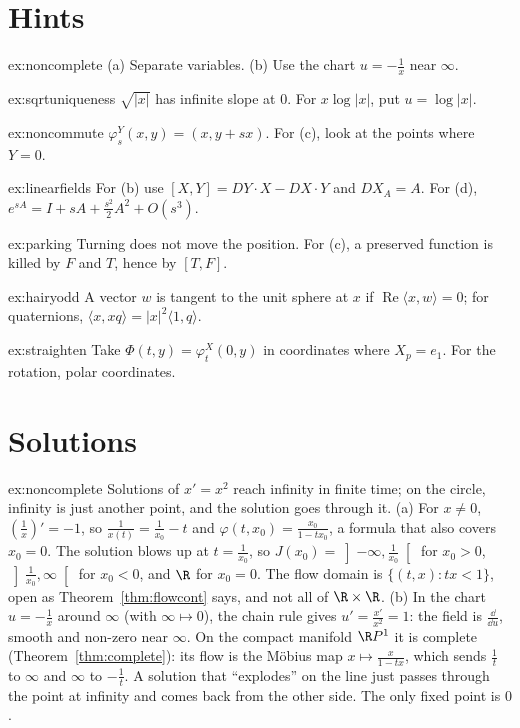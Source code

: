 \section{Hints}

\begin{hint}{ex:noncomplete}
(a) Separate variables. (b) Use the chart $u=-\frac1x$ near $\infty$.
\end{hint}
\begin{hint}{ex:sqrtuniqueness}
$\sqrt{|x|}$ has infinite slope at $0$. For $x\log|x|$, put $u=\log|x|$.
\end{hint}
\begin{hint}{ex:noncommute}
$\varphi^Y_s(x,y)=(x,y+sx)$. For (c), look at the points where $Y=0$.
\end{hint}
\begin{hint}{ex:linearfields}
For (b) use $[X,Y]=DY\cdot X-DX\cdot Y$ and $DX_A=A$. For (d), $e^{sA}=I+sA+\frac{s^2}2A^2+O(s^3)$.
\end{hint}
\begin{hint}{ex:parking}
Turning does not move the position. For (c), a preserved function is killed by $F$ and $T$, hence by $[T,F]$.
\end{hint}
\begin{hint}{ex:hairyodd}
A vector $w$ is tangent to the unit sphere at $x$ if $\operatorname{Re}\langle x,w\rangle=0$; for quaternions, $\langle x,xq\rangle=|x|^2\langle1,q\rangle$.
\end{hint}
\begin{hint}{ex:straighten}
Take $\Phi(t,y)=\varphi^X_t(0,y)$ in coordinates where $X_p=e_1$. For the rotation, polar coordinates.
\end{hint}

\section{Solutions}

\begin{solution}{ex:noncomplete}
\idea Solutions of $x'=x^2$ reach infinity in finite time; on the circle, infinity is just another point, and the solution goes through it.
\writeup (a) For $x\ne0$, $(\frac1x)'=-1$, so $\frac1{x(t)}=\frac1{x_0}-t$ and $\varphi(t,x_0)=\frac{x_0}{1-tx_0}$, a formula that also covers $x_0=0$. The solution
blows up at $t=\frac1{x_0}$, so $J(x_0)=\left]-\infty,\frac1{x_0}\right[$ for $x_0>0$, $\left]\frac1{x_0},\infty\right[$ for $x_0<0$, and $\R$ for $x_0=0$. The flow domain is
$\{(t,x):tx<1\}$, open as Theorem~\ref{thm:flowcont} says, and not all of $\R\times\R$. (b) In the chart $u=-\frac1x$ around $\infty$ (with $\infty\mapsto0$), the
chain rule gives $u'=\frac{x'}{x^2}=1$: the field is $\frac{\dd}{\dd u}$, smooth and non-zero near $\infty$. On the compact manifold $\R P^1$ it is complete
(Theorem~\ref{thm:complete}): its flow is the Möbius map $x\mapsto\frac x{1-tx}$, which sends $\frac1t$ to $\infty$ and $\infty$ to $-\frac1t$. A solution that ``explodes''
on the line just passes through the point at infinity and comes back from the other side. The only fixed point is $0$.
\end{solution}


